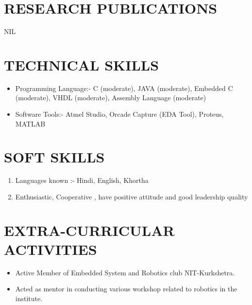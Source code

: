 \documentclass[11pt,a4paper,sans]{moderncv}
\begin{document}
\section{RESEARCH PUBLICATIONS}
NIL 
\newline \newline
\section{TECHNICAL SKILLS}
\begin{itemize}
\item Programming Language:- C (moderate), JAVA (moderate), Embedded C (moderate),  VHDL (moderate), Assembly Language (moderate)
\item Software Tools:- Atmel Studio,  Orcade Capture (EDA Tool), Proteus, MATLAB
\end{itemize}
\section{SOFT SKILLS}
\begin{enumerate}
\item Languages known :- Hindi, English, Khortha
\item Enthusiastic, Cooperative , have positive attitude and good leadership quality
\end{enumerate}

\section{EXTRA-CURRICULAR ACTIVITIES}
\begin{itemize}
\item Active Member of Embedded System and Robotics club NIT-Kurkshetra.
\item Acted as mentor in conducting various workshop related to robotics in the institute. 
\end{itemize}




\clearpage
\end{document}
